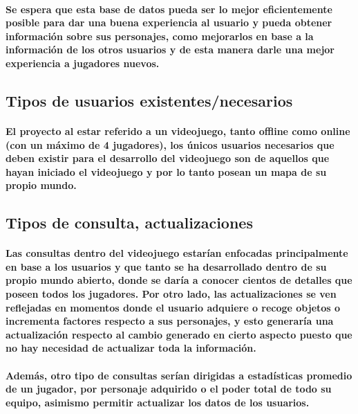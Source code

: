 \documentclass{report}
\begin{document}
\paragraph{Se espera que esta base de datos pueda ser lo mejor eficientemente posible para dar una buena experiencia al usuario y pueda obtener información sobre sus personajes, como mejorarlos en base a la información de los otros usuarios y de esta manera darle una mejor experiencia a jugadores nuevos.}

\subsection{Tipos de usuarios existentes/necesarios}
\paragraph{El proyecto al estar referido a un videojuego, tanto offline como online (con un máximo de 4 jugadores), los únicos usuarios necesarios que deben existir para el desarrollo del videojuego son de aquellos que hayan iniciado el videojuego y por lo tanto posean un mapa de su propio mundo.}

\subsection{Tipos de consulta, actualizaciones}
\paragraph{Las consultas dentro del videojuego estarían enfocadas principalmente en base a los usuarios y que tanto se ha desarrollado dentro de su propio mundo abierto, donde se daría a conocer cientos de detalles que poseen todos los jugadores. Por otro lado, las actualizaciones se ven reflejadas en momentos donde el usuario adquiere o recoge objetos o incrementa factores respecto a sus personajes, y esto generaría una actualización respecto al cambio generado en cierto aspecto puesto que no hay necesidad de actualizar toda la información.}
\paragraph{Además, otro tipo de consultas serían dirigidas a estadísticas promedio de un jugador, por personaje adquirido o el poder total de todo su equipo, asimismo permitir actualizar los datos de los usuarios.}
\end{document}

